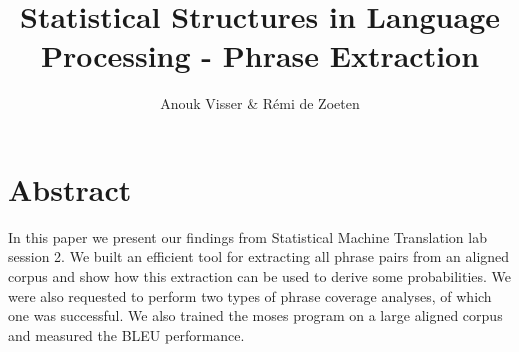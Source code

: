 \documentclass[11pt]{article}
\title{Statistical Structures in Language Processing - Phrase Extraction}
\author{Anouk Visser \& R\'emi de Zoeten}
\date{}
\begin{document}
\maketitle
\newpage
\tableofcontents
\newpage


\section{Abstract}
In this paper we present our findings from Statistical Machine Translation lab session 2. We built an efficient tool for extracting all phrase pairs from an aligned corpus and show how this extraction can be used to derive some probabilities. We were also requested to perform two types of phrase coverage analyses, of which one was successful. We  also trained the moses program on a large aligned corpus and measured the BLEU performance.
\end{document}
